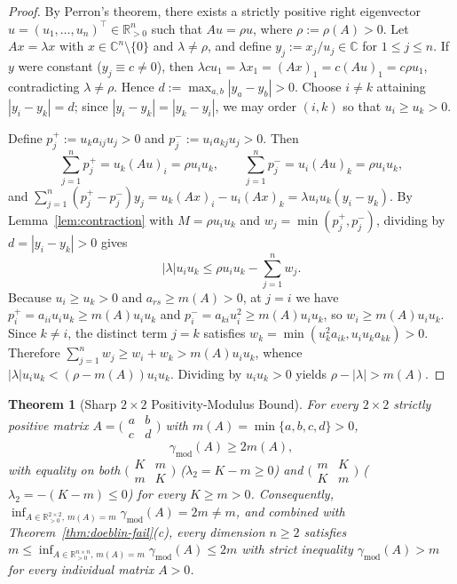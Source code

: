 \documentclass[11pt]{article}
\newtheorem{theorem}{Theorem}[section]
\theoremstyle{definition}
\newcommand{\R}{\mathbb{R}}
\newcommand{\C}{\mathbb{C}}
\begin{document}
\begin{proof}
By Perron's theorem, there exists a strictly positive right eigenvector $u = (u_1, \dots, u_n)^\top \in \R^n_{>0}$ such that $A u = \rho u$, where $\rho := \rho(A) > 0$. Let $A x = \lambda x$ with $x \in \C^n \setminus \{0\}$ and $\lambda \neq \rho$, and define $y_j := x_j / u_j \in \C$ for $1 \le j \le n$. If $y$ were constant ($y_j \equiv c \neq 0$), then $\lambda c u_1 = \lambda x_1 = (Ax)_1 = c (Au)_1 = c \rho u_1$, contradicting $\lambda \neq \rho$. Hence $d := \max_{a,b} |y_a - y_b| > 0$. Choose $i \neq k$ attaining $|y_i - y_k| = d$; since $|y_i - y_k| = |y_k - y_i|$, we may order $(i, k)$ so that $u_i \ge u_k > 0$.

Define $p^+_j := u_k a_{ij} u_j > 0$ and $p^-_j := u_i a_{kj} u_j > 0$. Then
\[
  \sum_{j=1}^n p^+_j = u_k (Au)_i = \rho u_i u_k,
  \qquad
  \sum_{j=1}^n p^-_j = u_i (Au)_k = \rho u_i u_k,
\]
and $\sum_{j=1}^n (p^+_j - p^-_j) y_j = u_k (Ax)_i - u_i (Ax)_k = \lambda u_i u_k (y_i - y_k)$. By Lemma~\ref{lem:contraction} with $M = \rho u_i u_k$ and $w_j = \min(p^+_j, p^-_j)$, dividing by $d = |y_i - y_k| > 0$ gives
\[
  |\lambda| u_i u_k \le \rho u_i u_k - \sum_{j=1}^n w_j.
\]
Because $u_i \ge u_k > 0$ and $a_{rs} \ge m(A) > 0$, at $j = i$ we have $p^+_i = a_{ii} u_i u_k \ge m(A) u_i u_k$ and $p^-_i = a_{ki} u_i^2 \ge m(A) u_i u_k$, so $w_i \ge m(A) u_i u_k$. Since $k \neq i$, the distinct term $j = k$ satisfies $w_k = \min(u_k^2 a_{ik}, u_i u_k a_{kk}) > 0$. Therefore $\sum_{j=1}^n w_j \ge w_i + w_k > m(A) u_i u_k$, whence $|\lambda| u_i u_k < (\rho - m(A)) u_i u_k$. Dividing by $u_i u_k > 0$ yields $\rho - |\lambda| > m(A)$.
\end{proof}

\begin{theorem}[Sharp $2 \times 2$ Positivity-Modulus Bound]\label{thm:sharp-2x2}
For every $2 \times 2$ strictly positive matrix $A = \bigl(\begin{smallmatrix} a & b \\ c & d \end{smallmatrix}\bigr)$ with $m(A) = \min\{a, b, c, d\} > 0$,
\[
  \gamma_{\mathrm{mod}}(A) \ge 2 m(A),
\]
with equality on both $\bigl(\begin{smallmatrix} K & m \\ m & K \end{smallmatrix}\bigr)$ ($\lambda_2 = K - m \ge 0$) and $\bigl(\begin{smallmatrix} m & K \\ K & m \end{smallmatrix}\bigr)$ ($\lambda_2 = -(K - m) \le 0$) for every $K \ge m > 0$. Consequently, $\inf_{A \in \R^{2 \times 2}_{>0},\, m(A) = m} \gamma_{\mathrm{mod}}(A) = 2m \neq m$, and combined with Theorem~\ref{thm:doeblin-fail}(c), every dimension $n \ge 2$ satisfies $m \le \inf_{A \in \R^{n \times n}_{>0},\, m(A)=m} \gamma_{\mathrm{mod}}(A) \le 2m$ with strict inequality $\gamma_{\mathrm{mod}}(A) > m$ for every individual matrix $A > 0$.
\end{theorem}
\end{document}
